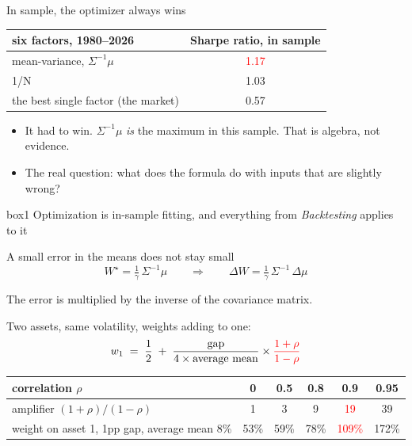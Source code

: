 \documentclass[aspectratio=169,10pt]{beamer}
\begin{document}
\begin{frame}{In sample, the optimizer always wins}
\vskip 4pt
\begin{center}
\renewcommand{\arraystretch}{1.35}
\begin{tabular}{lc}
\toprule
six factors, 1980--2026 & Sharpe ratio, in sample \\
\midrule
mean-variance, $\Sigma^{-1}\mu$ & \textcolor{red}{1.17} \\
1/N & 1.03 \\
the best single factor (the market) & 0.57 \\
\bottomrule
\end{tabular}
\end{center}
\vskip 8pt
\begin{itemize}
\item It had to win. $\Sigma^{-1}\mu$ \emph{is} the maximum in this sample. That is algebra, not evidence.
\vskip 6pt
\item The real question: what does the formula do with inputs that are slightly wrong?
\end{itemize}
\vskip 10pt
\begin{beamercolorbox}[rounded=true,sep=7pt,center]{box1}
Optimization is in-sample fitting, and everything from \emph{Backtesting} applies to it
\end{beamercolorbox}
\end{frame}

\begin{frame}[label=amp]{A small error in the means does not stay small}
\[ W^{\star} = \tfrac{1}{\gamma}\,\Sigma^{-1}\mu \qquad\Longrightarrow\qquad \Delta W = \tfrac{1}{\gamma}\,\Sigma^{-1}\,\Delta\mu \]
\begin{center}
The error is multiplied by the inverse of the covariance matrix.
\end{center}
\vskip 2pt
Two assets, same volatility, weights adding to one:
\[ w_{1} \;=\; \frac{1}{2} \;+\; \frac{\text{gap}}{4 \times \text{average mean}} \times \textcolor{red}{\frac{1+\rho}{1-\rho}} \]
\begin{center}
\renewcommand{\arraystretch}{1.2}
\begin{tabular}{lccccc}
\toprule
correlation $\rho$ & 0 & 0.5 & 0.8 & 0.9 & 0.95 \\
\midrule
amplifier $(1+\rho)/(1-\rho)$ & 1 & 3 & 9 & \textcolor{red}{19} & 39 \\
weight on asset 1, 1pp gap, average mean 8\% & 53\% & 59\% & 78\% & \textcolor{red}{109\%} & 172\% \\
\bottomrule
\end{tabular}
\end{center}
\vskip 2pt
\hfill \hyperlink{appendix_two}{}
\end{frame}
\end{document}
